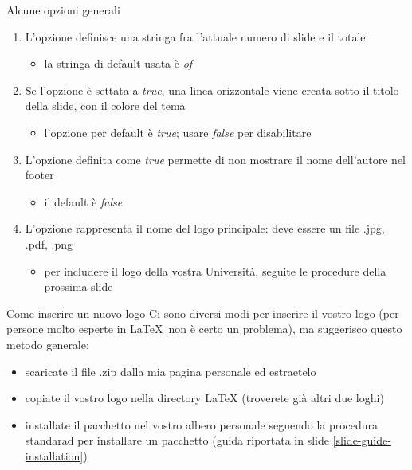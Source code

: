 \begin{tframe}{Alcune opzioni generali}
\begin{enumerate}
\item L'opzione  definisce una stringa fra l'attuale numero di slide e il totale
  \begin{itemize}
  \item la stringa di default usata è \emph{of}
  \end{itemize}
\item Se l'opzione  è settata a \emph{true}, una linea orizzontale viene creata sotto il titolo della slide, con il colore del tema
\begin{itemize}
  \item l'opzione per default è \emph{true}; usare \emph{false} per disabilitare
\end{itemize}
\item L'opzione  definita come \emph{true} permette di non mostrare il nome dell'autore nel footer
\begin{itemize}
\item il default è \emph{false}
\end{itemize}
\item L'opzione  rappresenta il nome del logo principale: deve essere un file .jpg, .pdf, .png
\begin{itemize}
\item per includere il logo della vostra Università, seguite le procedure della prossima slide
\end{itemize}
\end{enumerate}
\end{tframe}
\begin{tframe}{Come inserire un nuovo logo}
Ci sono diversi modi per inserire il vostro logo (per persone molto esperte in \LaTeX\, non è certo un problema), ma suggerisco questo metodo generale:
\begin{itemize}
\item scaricate il file .zip dalla mia pagina personale ed estraetelo
\item copiate il vostro logo nella directory LaTeX (troverete già altri due loghi)
\item installate il pacchetto nel vostro albero personale seguendo la procedura standarad per installare un pacchetto (guida riportata in slide \ref{slide-guide-installation})
\end{itemize}
\label{slide-rule-installation}
\end{tframe}
